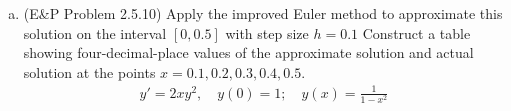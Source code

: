 \documentclass{article}
\begin{document}
\begin{enumerate}
\begin{enumerate}[(a)]
			\item (E\&P Problem 2.5.10) Apply the improved Euler method to approximate this solution on the interval $[0, 0.5]$ with step size $h=0.1$ Construct a table showing four-decimal-place values of the approximate solution and actual solution at the points $x=0.1, 0.2, 0.3, 0.4, 0.5.$
				\begin{align*}
					y'=2xy^2, \quad y(0)=1; \quad y(x)=\frac{1}{1-x^2}
				\end{align*}

		\end{enumerate}
		
\end{enumerate}
\end{document}
